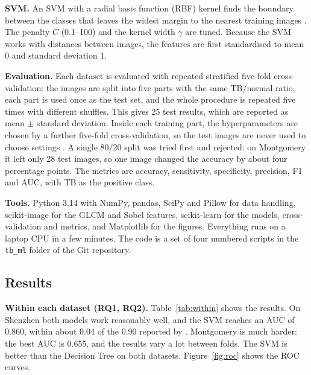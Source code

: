 \documentclass[11pt,a4paper]{article}
\begin{document}
\noindent\textbf{SVM. }An SVM with a radial basis function (RBF) kernel finds the boundary between the classes that leaves the widest margin to the nearest training images \citep{cortes1995}. The penalty $C$ (0.1--100) and the kernel width $\gamma$ are tuned. Because the SVM works with distances between images, the features are first standardised to mean 0 and standard deviation 1.

\noindent\textbf{Evaluation. }Each dataset is evaluated with repeated stratified five-fold cross-validation: the images are split into five parts with the same TB/normal ratio, each part is used once as the test set, and the whole procedure is repeated five times with different shuffles. This gives 25 test results, which are reported as mean $\pm$ standard deviation. Inside each training part, the hyperparameters are chosen by a further five-fold cross-validation, so the test images are never used to choose settings \citep{varma2006}. A single 80/20 split was tried first and rejected: on Montgomery it left only 28 test images, so one image changed the accuracy by about four percentage points. The metrics are accuracy, sensitivity, specificity, precision, F1 and AUC, with TB as the positive class.

\noindent\textbf{Tools. }Python 3.14 with NumPy, pandas, SciPy and Pillow for data handling, scikit-image for the GLCM and Sobel features, scikit-learn for the models, cross-validation and metrics, and Matplotlib for the figures. Everything runs on a laptop CPU in a few minutes. The code is a set of four numbered scripts in the \texttt{tb\_ml} folder of the Git repository.

\subsection{Results}\label{sec:results}
\noindent\textbf{Within each dataset (RQ1, RQ2). }Table~\ref{tab:within} shows the results. On Shenzhen both models work reasonably well, and the SVM reaches an AUC of 0.860, within about 0.04 of the 0.90 reported by \citet{jaeger2014tmi}. Montgomery is much harder: the best AUC is 0.655, and the results vary a lot between folds. The SVM is better than the Decision Tree on both datasets. Figure~\ref{fig:roc} shows the ROC curves.
\end{document}
